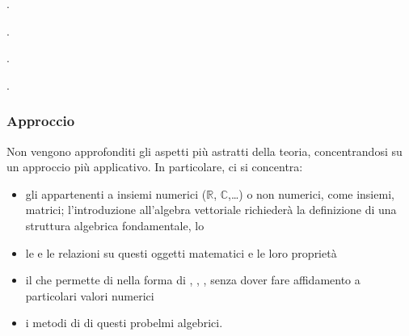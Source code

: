 \documentclass[letterpaper,10pt,italian]{jupyterBook}
\begin{document}
\sphinxAtStartPar
{\hyperref[\detokenize{ch/algebra/linear-algebra:math-hs-algebra-linear}]{}}.

\sphinxAtStartPar
{\hyperref[\detokenize{ch/algebra/vector-algebra:math-hs-algebra-vector}]{}}.

\sphinxAtStartPar
{\hyperref[\detokenize{ch/algebra/complex-algebra:math-hs-algebra-complex}]{}}.

\sphinxAtStartPar
{\hyperref[\detokenize{ch/set:math-hs-set-algebra}]{}}.
\subsubsection*{Approccio}

\sphinxAtStartPar
Non vengono approfonditi gli aspetti più astratti della teoria, concentrandosi su un approccio più applicativo. In particolare, ci si concentra:
\begin{itemize}
\item {} 
\sphinxAtStartPar
gli  appartenenti a insiemi numerici (\(\mathbb{R}\), \(\mathbb{C}\),…) o non numerici, come insiemi, matrici; l’introduzione all’algebra vettoriale richiederà la definizione di una struttura algebrica fondamentale, lo 

\item {} 
\sphinxAtStartPar
le  e le relazioni su questi oggetti matematici e le loro proprietà

\item {} 
\sphinxAtStartPar
il  che permette di {\hyperref[\detokenize{ch/program/delta:math-hs-program-delta}]{}} nella forma di , , , senza dover fare affidamento a particolari valori numerici

\item {} 
\sphinxAtStartPar
i metodi di  di questi probelmi algebrici.

\end{itemize}
\end{document}

